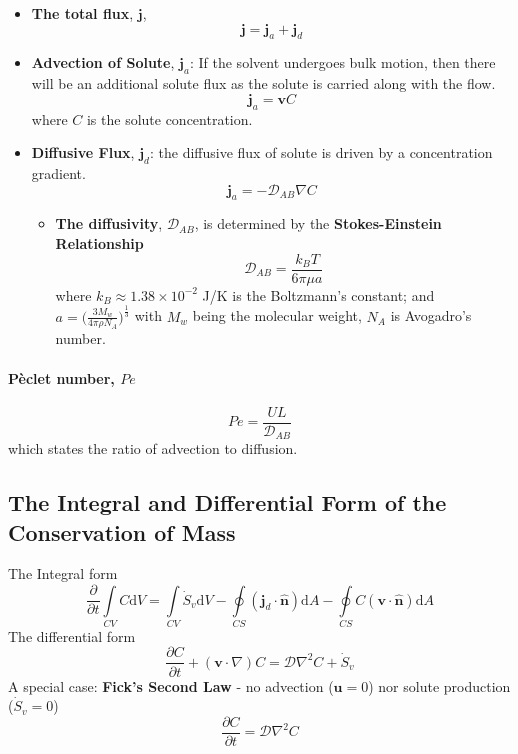 \documentclass[12pt, a4paper]{article}
\begin{document}
\begin{itemize}
    \item \textbf{The total flux}, $\bm{j}$, 
    \[
    \bm{j} = \bm{j}_a + \bm{j}_d
    \]
    
    \item \textbf{Advection of Solute}, $\bm{j}_a$: If the solvent undergoes bulk motion, then there will be an additional solute flux as the solute is carried along with the flow.
    \[
        \bm{j}_a = \bm{v}C
    \]
    where $C$ is the solute concentration.
    
    \item \textbf{Diffusive Flux}, $\bm{j}_d$: the diffusive flux of solute is driven by a concentration gradient.
    \[
        \bm{j}_a = -\mathcal{D}_{AB}\nabla C
    \]
        \begin{itemize}
            \item \textbf{The diffusivity}, $\mathcal{D}_{AB}$, is determined by the \textbf{Stokes-Einstein Relationship}
            \[
               \mathcal{D}_{AB} = \frac{k_{B}T}{6\pi \mu a} 
            \]
            where $k_B \approx 1.38\times 10^{-2}$ J/K is the Boltzmann's constant; and $\displaystyle a = \bigg(\frac{3M_w}{4\pi \rho N_A}\bigg)^{\frac{1}{3}}$ with $M_w$ being the molecular weight, $N_A$ is Avogadro’s number.
        \end{itemize}
\end{itemize}
\paragraph{P\`eclet number, $Pe$}
\[
    Pe = \frac{U L}{\mathcal{D}_{AB}}
\]
which states the ratio of advection to diffusion.

\subsection{The Integral and Differential Form of the Conservation of Mass}
The Integral form
\[
    \frac{\partial}{\partial t} \int\limits_{CV} C \mathrm{d}V = \int\limits_{CV} \dot{S}_v \mathrm{d}V - \oint\limits_{CS} (\bm{j}_d \cdot \hat{\bm{n}}) \mathrm{d}A - \oint\limits_{CS} C (\bm{v} \cdot \hat{\bm{n}}) \mathrm{d}A
\]
The differential form
\[
    \frac{\partial C}{\partial t} + (\bm{v} \cdot \nabla)C = \mathcal{D}\nabla^2 C + \dot{S}_{v}
\]
A special case: \textbf{Fick's Second Law} - no advection ($\bm{u}=0$) nor solute production ($\dot{S}_{v}=0$)
\[
    \frac{\partial C}{\partial t} = \mathcal{D}\nabla^2 C
\]
\end{document}
